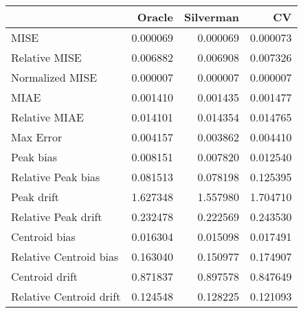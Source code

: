 \begin{tabular}{lrrr}
  \hline
 & Oracle & Silverman & CV \\ 
  \hline
MISE & 0.000069 & 0.000069 & 0.000073 \\ 
  Relative MISE & 0.006882 & 0.006908 & 0.007326 \\ 
  Normalized MISE & 0.000007 & 0.000007 & 0.000007 \\ 
  MIAE & 0.001410 & 0.001435 & 0.001477 \\ 
  Relative MIAE & 0.014101 & 0.014354 & 0.014765 \\ 
  Max Error & 0.004157 & 0.003862 & 0.004410 \\ 
  Peak bias & 0.008151 & 0.007820 & 0.012540 \\ 
  Relative Peak bias & 0.081513 & 0.078198 & 0.125395 \\ 
  Peak drift & 1.627348 & 1.557980 & 1.704710 \\ 
  Relative Peak drift & 0.232478 & 0.222569 & 0.243530 \\ 
  Centroid bias & 0.016304 & 0.015098 & 0.017491 \\ 
  Relative Centroid bias & 0.163040 & 0.150977 & 0.174907 \\ 
  Centroid drift & 0.871837 & 0.897578 & 0.847649 \\ 
  Relative Centroid drift & 0.124548 & 0.128225 & 0.121093 \\ 
   \hline
\end{tabular}
